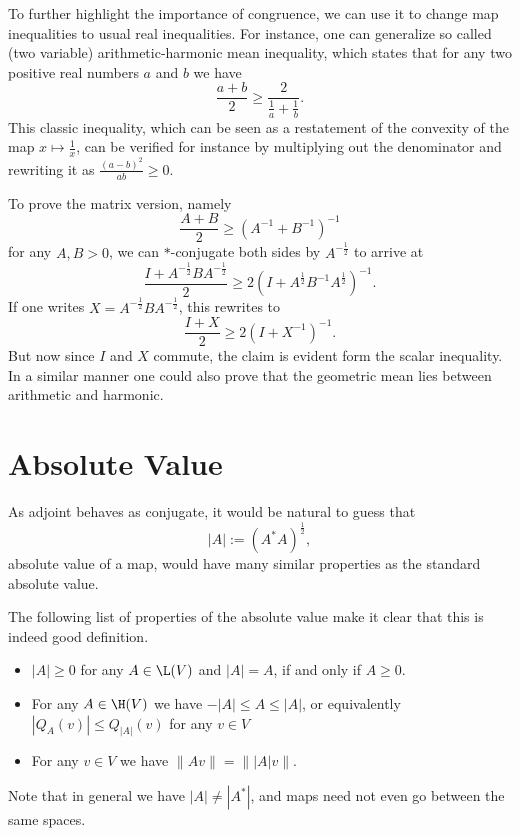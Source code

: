 To further highlight the importance of congruence, we can use it to change map inequalities to usual real inequalities. For instance, one can generalize so called (two variable) arithmetic-harmonic mean inequality, which states that for any two positive real numbers $a$ and $b$ we have
\[
	\frac{a + b}{2} \geq \frac{2}{\frac{1}{a} + \frac{1}{b}}.
\]
This classic inequality, which can be seen as a restatement of the convexity of the map $x \mapsto \frac{1}{x}$, can be verified for instance by multiplying out the denominator and rewriting it as $\frac{(a - b)^{2}}{ab} \geq 0$.

To prove the matrix version, namely
\[
	\frac{A + B}{2} \geq (A^{-1} + B^{-1})^{-1}
\]
for any $A, B > 0$, we can $*$-conjugate both sides by $A^{-\frac{1}{2}}$ to arrive at
\[
	\frac{I + A^{-\frac{1}{2}}B A^{-\frac{1}{2}}}{2} \geq 2 (I + A^{\frac{1}{2}}B^{-1} A^{\frac{1}{2}})^{-1}.
\]
If one writes $X = A^{-\frac{1}{2}}B A^{-\frac{1}{2}}$, this rewrites to
\[
	\frac{I + X}{2} \geq 2 (I + X^{-1})^{-1}.
\]
But now since $I$ and $X$ commute, the claim is evident form the scalar inequality. In a similar manner one could also prove that the geometric mean lies between arithmetic and harmonic.

\section{Absolute Value}

As adjoint behaves as conjugate, it would be natural to guess that
\[
	|A| := \left(A^{*}A\right)^{\frac{1}{2}},
\]
absolute value of a map, would have many similar properties as the standard absolute value.

The following list of properties of the absolute value make it clear that this is indeed good definition.

\begin{itemize}
	\item $|A| \geq 0$ for any $A \in \L(V)$ and $|A| = A$, if and only if $A \geq 0$.
	\item For any $A \in \H(V)$ we have $-|A| \leq A \leq |A|$, or equivalently $|Q_{A}(v)| \leq Q_{|A|}(v)$ for any $v \in V$
	\item For any $v \in V$ we have $\|A v\| = \||A|v\|$.
\end{itemize}

 Note that in general we have $|A| \neq |A^{*}|$, and maps need not even go between the same spaces.

